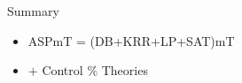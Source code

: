 \begin{frame}[c]{Summary}
  \begin{itemize}
  \item <1-> ASPmT = {(DB+KRR+LP+SAT)mT}
    \medskip
  \item <3-> \clingo $+$ \alert<3-4>{Control} $\%$ \alert<3-4>{Theories}
  \end{itemize}
\end{frame}
%
